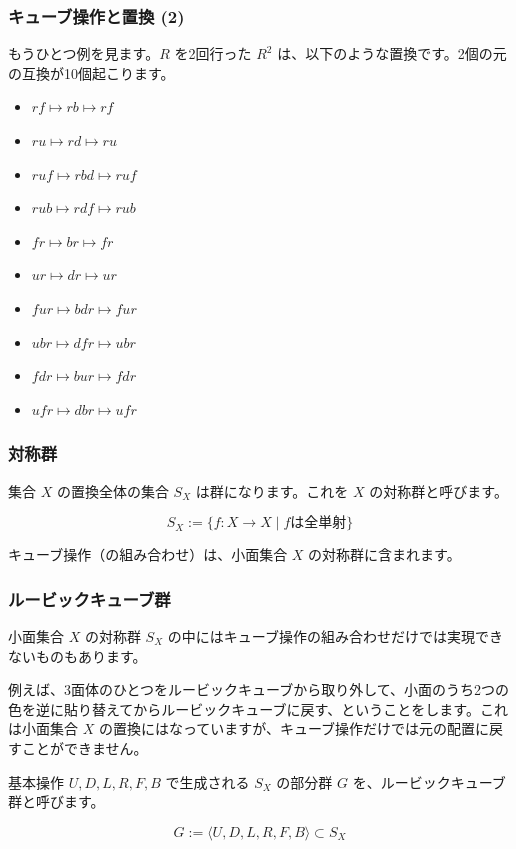 \documentclass{beamer}
\begin{document}
\begin{frame}
    \frametitle{キューブ操作と置換 (2)}

    もうひとつ例を見ます。\(R\) を2回行った \(R^2\) は、以下のような置換です。2個の元の互換が10個起こります。

    \begin{itemize}
        \item \(rf \mapsto rb \mapsto rf\)
        \item \(ru \mapsto rd \mapsto ru\)
        \item \(ruf \mapsto rbd \mapsto ruf\)
        \item \(rub \mapsto rdf \mapsto rub\)
        \item \(fr \mapsto br \mapsto fr\)
        \item \(ur \mapsto dr \mapsto ur\)
        \item \(fur \mapsto bdr \mapsto fur\)
        \item \(ubr \mapsto dfr \mapsto ubr\)
        \item \(fdr \mapsto bur \mapsto fdr\)
        \item \(ufr \mapsto dbr \mapsto ufr\)
    \end{itemize}
\end{frame}

\begin{frame}
    \frametitle{対称群}

    集合 \(X\) の置換全体の集合 \(S_X\) は群になります。これを \(X\) の対称群と呼びます。

    \[
        S_X := \{f : X \to X \mid f \text{は全単射}\}
    \]

    キューブ操作（の組み合わせ）は、小面集合 \(X\) の対称群に含まれます。
\end{frame}

\begin{frame}
    \frametitle{ルービックキューブ群}

    小面集合 \(X\) の対称群 \(S_X\) の中にはキューブ操作の組み合わせだけでは実現できないものもあります。

    例えば、3面体のひとつをルービックキューブから取り外して、小面のうち2つの色を逆に貼り替えてからルービックキューブに戻す、ということをします。これは小面集合 \(X\) の置換にはなっていますが、キューブ操作だけでは元の配置に戻すことができません。

    \bigskip

    基本操作 \(U, D, L, R, F, B\) で生成される \(S_X\) の部分群 \(G\) を、ルービックキューブ群と呼びます。

    \[
        G := \langle U, D, L, R, F, B \rangle \subset S_X
    \]
\end{frame}
\end{document}
